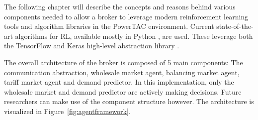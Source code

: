 The following chapter will describe the concepts and reasons behind various components needed to allow a broker to
leverage modern reinforcement learning tools and algorithm libraries in the \ac{PowerTAC} environment. Current state-of-the-art
algorithms for \ac{RL}, available mostly in Python \citep{baselines}, are used. These leverage both the TensorFlow and
Keras high-level abstraction library \citep{plappert2016kerasrl}.


The overall architecture of the broker is composed of 5 main components: The communication abstraction, wholesale market
agent, balancing market agent, tariff market agent and demand predictor. In this implementation, only the wholesale
market and demand predictor are actively making decisions. Future researchers can make use of the component structure however.
The architecture is visualized in Figure~\ref{fig:agentframework}.

